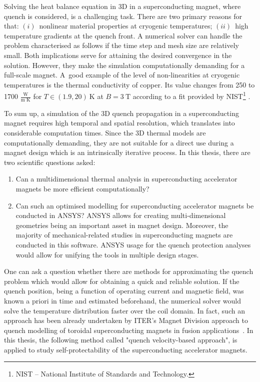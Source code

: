 
Solving the heat balance equation in 3D in a superconducting magnet, where quench is considered, is a challenging task. There are two primary reasons for that: $(i)$~nonlinear material properties at cryogenic temperatures; $(ii)$~high temperature gradients at the quench front. A numerical solver can handle the problem characterised as follows if the time step and mesh size are relatively small. Both implications serve for attaining the desired convergence in the solution. However, they make the simulation computationally demanding for a full-scale magnet. A~good example of the level of non-linearities at cryogenic temperatures is the thermal conductivity of copper. Its value changes from 250 to 1700 $\frac{\text{W}}{\text{m K}}$ for $T \in (1.9, 20)~\text{K}$ at $B=3~\text{T}$ according to a fit provided by NIST\footnote{NIST -- National Institute of Standards and Technology.} \cite[p.~9-13]{material_properties_roxie}. 

To sum up, a simulation of the 3D quench propagation in a superconducting magnet requires high temporal and spatial resolution, which translates into considerable computation times. Since the 3D thermal models are computationally demanding, they are not suitable for a direct use during a magnet design which is an intrinsically iterative process. In this thesis, there are two scientific questions asked:

\begin{enumerate}
\item Can a multidimensional thermal analysis in superconducting accelerator magnets be more efficient computationally?
\item Can such an optimised modelling for superconducting accelerator magnets be conducted in ANSYS? ANSYS allows for creating multi-dimensional geometries being an important asset in magnet design. Moreover, the majority of mechanical-related studies in superconducting magnets are conducted in this software. ANSYS usage for the quench protection analyses would allow for unifying the tools in multiple design stages.
\end{enumerate}

One can ask a question whether there are methods for approximating the quench problem which would allow for obtaining a quick and reliable solution. If the quench position, being a function of operating current and magnetic field, was known a priori in time and estimated beforehand, the numerical solver would solve the temperature distribution faster over the coil domain. In fact, such an approach has been already undertaken by ITER's Magnet Division approach to quench modelling of toroidal superconducting magnets in fusion applications~\cite{iter_presentation_qualified_analysis, iter_fault_case_study}. In this thesis, the following method called "quench velocity-based approach", is applied to study self-protectability of the superconducting accelerator magnets. 

